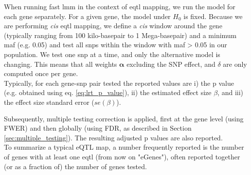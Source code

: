 When running fast \gls{lmm} in the context of \gls{eqtl} mapping, we run the model for each gene separately.
For a given gene, the model under $H_0$ is fixed.
Because we are performing \textit{cis} \gls{eqtl} mapping, we define a \textit{cis} window around the gene (typically ranging from 100 kilo-basepair to 1 Mega-basepair) and a minimum \gls{maf} (e.g. 0.05) and test all \gls{snp}s within the window with \gls{maf} > 0.05 in our population.  
We test one \gls{snp} at a time, and only the alternative model is changing.
This means that all weights $\boldsymbol{\alpha}$ excluding the SNP effect, and $\delta$ are only computed once per gene.\\

Typically, for each gene-\gls{snp} pair tested the reported values are i) the p value (e.g. obtained using eq. \eqref{eq:lrt_p_value}), ii) the estimated effect size $\beta$, and iii) the effect size standard error ($se(\beta)$).


Subsequently, multiple testing correction is applied, first at the gene level (using FWER) and then globally (using FDR, as described in Section \ref{sec:multiple_testing}).
The resulting adjusted p values are also reported.\\

To summarize a typical eQTL map, a number frequently reported is the number of genes with at least one \gls{eqtl} (from now on "eGenes"), often reported together (or as a fraction of) the number of genes tested. \\







